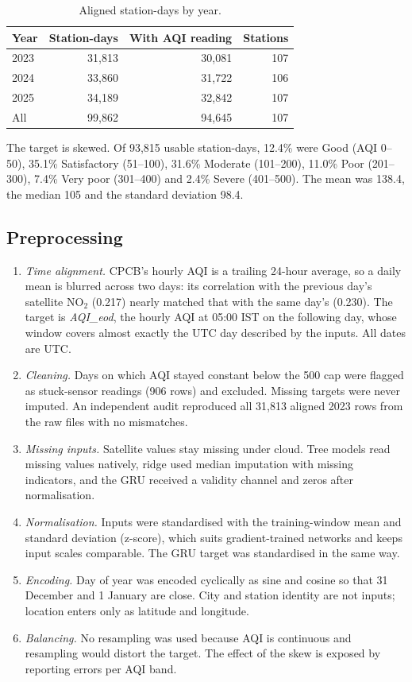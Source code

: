 \documentclass[pdflatex,sn-mathphys-num]{sn-jnl}
\begin{document}
\begin{table}[!htbp]
\centering
\small
\caption{Aligned station-days by year.}\label{tab:data}
\begin{tabular}{lrrr}
\toprule
\textbf{Year} & \textbf{Station-days} & \textbf{With AQI reading} & \textbf{Stations} \\
\midrule
2023 & 31,813 & 30,081 & 107 \\
2024 & 33,860 & 31,722 & 106 \\
2025 & 34,189 & 32,842 & 107 \\
All & 99,862 & 94,645 & 107 \\
\bottomrule
\end{tabular}
\end{table}

The target is skewed. Of 93,815 usable station-days, 12.4\% were Good (AQI 0--50), 35.1\% Satisfactory (51--100), 31.6\% Moderate (101--200), 11.0\% Poor (201--300), 7.4\% Very poor (301--400) and 2.4\% Severe (401--500). The mean was 138.4, the median 105 and the standard deviation 98.4.

\subsection{Preprocessing}
\begin{enumerate}
\item \emph{Time alignment.} CPCB's hourly AQI is a trailing 24-hour average, so a daily mean is blurred across two days: its correlation with the previous day's satellite NO$_2$ (0.217) nearly matched that with the same day's (0.230). The target is \textit{AQI\_eod}, the hourly AQI at 05:00 IST on the following day, whose window covers almost exactly the UTC day described by the inputs. All dates are UTC.
\item \emph{Cleaning.} Days on which AQI stayed constant below the 500 cap were flagged as stuck-sensor readings (906 rows) and excluded. Missing targets were never imputed. An independent audit reproduced all 31,813 aligned 2023 rows from the raw files with no mismatches.
\item \emph{Missing inputs.} Satellite values stay missing under cloud. Tree models read missing values natively, ridge used median imputation with missing indicators, and the GRU received a validity channel and zeros after normalisation.
\item \emph{Normalisation.} Inputs were standardised with the training-window mean and standard deviation (z-score), which suits gradient-trained networks and keeps input scales comparable. The GRU target was standardised in the same way.
\item \emph{Encoding.} Day of year was encoded cyclically as sine and cosine so that 31 December and 1 January are close. City and station identity are not inputs; location enters only as latitude and longitude.
\item \emph{Balancing.} No resampling was used because AQI is continuous and resampling would distort the target. The effect of the skew is exposed by reporting errors per AQI band.
\end{enumerate}
\end{document}

